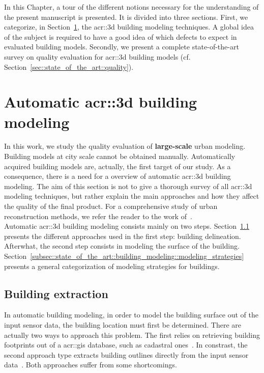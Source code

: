 \minitoc

\vfill

In this Chapter, a tour of the different notions necessary for the understanding of the present manuscript is presented.
It is divided into three sections.
First, we categorize, in Section~\ref{sec::state_of_the_art::building_modeling}, the \gls{acr::3d} building modeling techniques.
A global idea of the subject is required to have a good idea of which defects to expect in evaluated building models.
Secondly, we present a complete state-of-the-art survey on quality evaluation for \gls{acr::3d} building models (cf. Section~\ref{sec::state_of_the_art::quality}).

\clearpage

\section{Automatic \texorpdfstring{\gls*{acr::3d}}{3D} building modeling}
    \label{sec::state_of_the_art::building_modeling}
    In this work, we study the quality evaluation of \textbf{large-scale} urban modeling.
    Building models at city scale cannot be obtained manually.
    Automatically acquired building models are, actually, the first target of our study.
    As a consequence, there is a need for a overview of automatic \gls{acr::3d} building modeling.
    The aim of this section is not to give a thorough survey of all \gls{acr::3d} modeling techniques, but rather explain the main approaches and how they affect the quality of the final product.
    For a comprehensive study of urban reconstruction methods, we refer the reader to the work of~\textcite{musialski2013survey}.\\

    Automatic \gls{acr::3d} building modeling consists mainly on two steps.
    Section~\ref{subsec::state_of_the_art::building_modeling::building_extraction} presents the different approaches used in the first step: building delineation.
    Afterwhat, the second step consists in modeling the surface of the building.
    Section~\ref{subsec::state_of_the_art::building_modeling::modeling_strategies} presents a general categorization of modeling strategies for buildings.

    \subsection{Building extraction}
        \label{subsec::state_of_the_art::building_modeling::building_extraction}
        In automatic building modeling, in order to model the building surface out of the input sensor data, the building location must first be determined.
        There are actually two ways to approach this problem.
        The first relies on retrieving building footprints out of a \gls{acr::gis} database, such as cadastral ones~\parencite{taillandier2004automatic,durupt2006automatic,horna2007building,ledoux2011topologically,biljecki2017generating,biljecki2019raise}.
        In constrast, the second approach type extracts building outlines directly from the input sensor data~\parencite{poullis2009automatic,lafarge2012creating,nguatem2017modeling,zhu2018large}.
        Both approaches suffer from some shortcomings.


